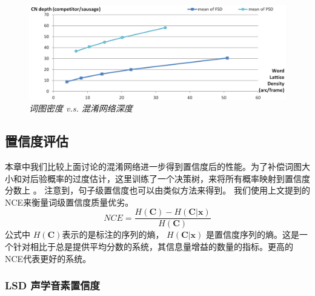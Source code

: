       \begin{figure}[tbhp!]
        \centering
        \includegraphics[width=\linewidth]{figure/latden-cndepth.png}

        \caption{{\it 词图密度 v.s. 混淆网络深度 }}
        \label{fig:latden-cndepth}

      \end{figure}





\subsection{置信度评估}

本章中我们比较上面讨论的混淆网络进一步得到置信度后的性能。为了补偿词图大小和对后验概率的过度估计，这里训练了一个决策树，来将所有概率映射到置信度分数上 \cite{evermann2000large}。 注意到，句子级置信度也可以由类似方法来得到。
我们使用上文提到的NCE来衡量词级置信度质量优劣。
     \begin{equation}\label{eq:nce}
    NCE=\frac{H(\mathbf{C})-H(\mathbf{C}|\mathbf{x})}{H(\mathbf{C})}
     \end{equation}
公式中 $H(\mathbf{C})$表示的是标注的序列的熵， $H(\mathbf{C}|\mathbf{x})$ 是置信度序列的熵。这是一个针对相比于总是提供平均分数的系统，其信息量增益的数量的指标。更高的NCE代表更好的系统。

\subsubsection{LSD 声学音素置信度}

